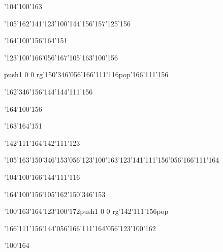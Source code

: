 \null\vfill\ipa\centerline{\enskip\enskip\enskip\enskip\enskip\enskip\enskip\char'104\char'100\char'163}\medskip\centerline{\enskip\char'105\char'162\enskip\char'141\enskip\enskip\enskip\enskip\char'123\char'100\char'144\enskip\char'156\char'157\char'125\char'156\enskip\enskip\enskip\enskip}\medskip\centerline{\enskip\char'164\char'100\char'156\enskip\enskip\enskip\enskip\char'164\char'151\enskip\enskip\enskip\enskip\enskip\enskip\enskip}\medskip\centerline{\enskip\char'123\char'100\char'166\char'056\char'167\char'105\char'163\enskip\char'100\char'156\enskip\enskip\enskip\enskip\enskip\enskip}\medskip\centerline{\enskip\enskip\enskip\enskip\enskip\pdfcolorstack\match push{1 0 0 rg}\char'150\char'346\char'056\char'166\char'111\char'116\pdfcolorstack\match pop{}\enskip\char'166\char'111\char'156}\medskip\centerline{\enskip\enskip\enskip\enskip\enskip\char'162\char'346\char'156\char'144\enskip\enskip\enskip\enskip\char'144\char'111\char'156}\medskip\centerline{\enskip\enskip\enskip\enskip\enskip\enskip\enskip\char'164\char'100\char'156\enskip\enskip\enskip\enskip}\medskip\centerline{\enskip\enskip\enskip\enskip\enskip\enskip\enskip\enskip\enskip\enskip\enskip\enskip\enskip\enskip\enskip\enskip\char'163\char'164\char'151}\medskip\vfill\footline{\hfil\tt\folio\hfil}\eject
\null\vfill\ipa\centerline{\enskip\char'142\char'111\char'164\enskip\enskip\enskip\enskip\char'142\char'111\char'123}\medskip\centerline{\enskip\char'105\char'163\enskip\enskip\enskip\char'150\char'346\char'153\char'056\char'123\char'100\char'163\enskip\char'123\char'141\char'111\char'156\char'056\char'166\char'111\char'164}\medskip\centerline{\enskip\char'104\char'100\char'166\enskip\enskip\enskip\enskip\enskip\enskip\enskip\enskip\enskip\enskip\char'144\char'111\char'116}\medskip\centerline{\enskip\char'164\char'100\char'156\enskip\enskip\enskip\enskip\enskip\char'105\char'162\enskip\enskip\enskip\char'150\char'346\char'153}\medskip\centerline{\enskip\char'100\char'163\char'164\enskip\enskip\enskip\char'123\char'100\char'172\enskip\pdfcolorstack\match push{1 0 0 rg}\char'142\char'111\char'156\pdfcolorstack\match pop{}}\medskip\centerline{\enskip\enskip\enskip\enskip\enskip\char'166\char'111\char'156\char'144\char'056\char'166\char'111\char'164\char'056\char'123\char'100\char'162}\medskip\centerline{\enskip\enskip\enskip\enskip\enskip\enskip\enskip\enskip\enskip\enskip\enskip\enskip\enskip\enskip}\medskip\centerline{\enskip\enskip\enskip\enskip\enskip\enskip\enskip\enskip\enskip\enskip\enskip\enskip\enskip\enskip\char'100\char'164\enskip\enskip\enskip\enskip}\medskip\vfill\footline{\hfil\tt\folio\hfil}\eject
